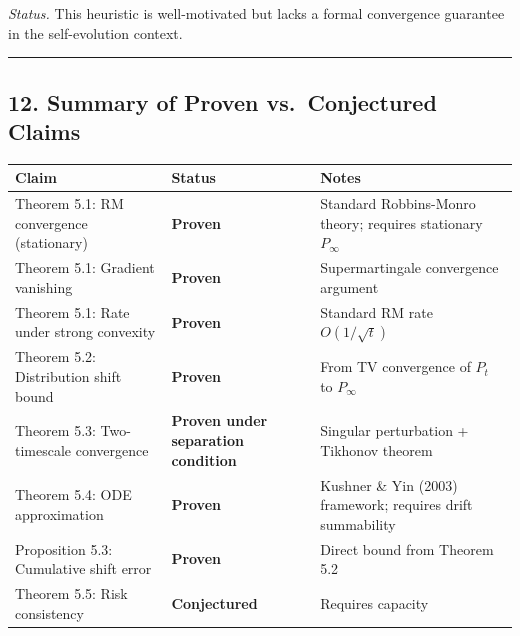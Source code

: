 \documentclass[
  12pt,
]{article}
\begin{document}
\emph{Status.} This heuristic is well-motivated but lacks a formal
convergence guarantee in the self-evolution context.

\begin{center}\rule{0.5\linewidth}{0.5pt}\end{center}

\subsection{12. Summary of Proven vs.~Conjectured
Claims}\label{summary-of-proven-vs.-conjectured-claims}

\begin{longtable}[]{@{}
  >{\raggedright\arraybackslash}p{}
  >{\raggedright\arraybackslash}p{}
  >{\raggedright\arraybackslash}p{}@{}}
\toprule\noalign{}
\begin{minipage}[b]{\linewidth}\raggedright
Claim
\end{minipage} & \begin{minipage}[b]{\linewidth}\raggedright
Status
\end{minipage} & \begin{minipage}[b]{\linewidth}\raggedright
Notes
\end{minipage} \\
\midrule\noalign{}
\endhead
\bottomrule\noalign{}
\endlastfoot
Theorem 5.1: RM convergence (stationary) & \textbf{Proven} & Standard
Robbins-Monro theory; requires stationary \(P_\infty\) \\
Theorem 5.1: Gradient vanishing & \textbf{Proven} & Supermartingale
convergence argument \\
Theorem 5.1: Rate under strong convexity & \textbf{Proven} & Standard RM
rate \(O(1/\sqrt{t})\) \\
Theorem 5.2: Distribution shift bound & \textbf{Proven} & From TV
convergence of \(P_t\) to \(P_\infty\) \\
Theorem 5.3: Two-timescale convergence & \textbf{Proven under separation
condition} & Singular perturbation + Tikhonov theorem \\
Theorem 5.4: ODE approximation & \textbf{Proven} & Kushner \& Yin (2003)
framework; requires drift summability \\
Proposition 5.3: Cumulative shift error & \textbf{Proven} & Direct bound
from Theorem 5.2 \\
Theorem 5.5: Risk consistency & \textbf{Conjectured} & Requires capacity

\end{longtable}
\end{document}
